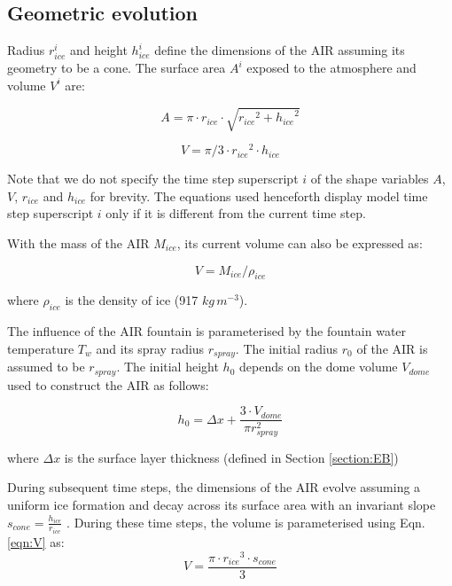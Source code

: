 \documentclass[utf8]{frontiersSCNS} %
\begin{document}
\subsection{Geometric evolution}

Radius $r_{ice}^i$ and height $h_{ice}^i$ define the dimensions of the AIR assuming its geometry to be a cone. The
surface area $A^i$ exposed to the atmosphere and volume $V^i$ are:

\begin{equation} A = \pi \cdot r_{ice} \cdot \sqrt{{r_{ice}}^2 + {h_{ice}}^ 2} \label{eqn:A} \end{equation}

\begin{equation} V = \pi/3 \cdot {r_{ice}}^2 \cdot h_{ice} \label{eqn:V} \end{equation}

Note that we do not specify the time step superscript $i$ of the shape variables $A$, $V$, $r_{ice}$ and $h_{ice}$ for
brevity.  The equations used henceforth display model time step superscript $i$ only if it is different from the
current time step.

With the mass of the AIR $M_{ice}$, its current volume can also be expressed as: 

\begin{equation} V = M_{ice} /\rho_{ice} \label{eqn:V1} \end{equation} 

where $\rho_{ice}$ is the density of ice (917 $kg\, m^{-3}$). 


The influence of the AIR fountain is parameterised by the fountain water temperature $T_{w}$ and its spray radius $r_{spray}$.
The initial radius $r_0$ of the AIR is assumed to be $r_{spray}$. The initial height $h_0$ depends on the dome volume
$V_{dome}$ used to construct the AIR as follows:

\begin{equation} 
    h_{0} =  \Delta x + \frac{3 \cdot V_{dome}}{\pi r_{spray}^2 } 
\label{eqn:h0}
  \end{equation}

where $\Delta x$ is the surface layer thickness (defined in Section \ref{section:EB})

During subsequent time steps, the dimensions of the AIR evolve assuming a uniform ice formation and decay across
its surface area with an invariant slope $s_{cone} = \frac{h_{ice}}{r_{ice}}$ .  During
these time steps, the volume is parameterised using Eqn. \ref{eqn:V} as:\begin{equation} V = \frac{\pi \cdot {r_{ice}}^3
    \cdot s_{cone}}{3} \label{eqn:V2} \end{equation} 
\end{document}
